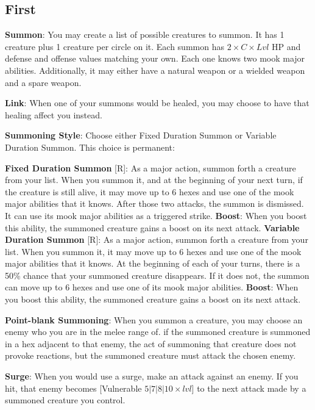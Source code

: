 \begin{multicols}{2}
\raggedcolumns
\subsection*{First \Facet}
\textbf{Summon}: You may create a list of possible creatures to summon. It has 1 creature plus 1 creature per circle on it. Each summon has $2 \times C \times Lvl$ HP and defense and offense values matching your own. Each one knows two mook major abilities. Additionally, it may either have a natural weapon or a wielded weapon and a spare weapon.

\textbf{Link}: When one of your summons would be healed, you may choose to have that healing affect you instead.

\textbf{Summoning Style}: Choose either Fixed Duration Summon or Variable Duration Summon. This choice is permanent:
\begin{itemize}
\thing \textbf{Fixed Duration Summon} [R]: As a major action, summon forth a creature from your list. When you summon it, and at the beginning of your next turn, if the creature is still alive, it may move up to 6 hexes and use one of the mook major abilities that it knows. After those two attacks, the summon is dismissed. It can use its mook major abilities as a triggered strike. \textbf{Boost}: When you boost this ability, the summoned creature gains a boost on its next attack.
\thing \textbf{Variable Duration Summon} [R]: As a major action, summon forth a creature from your list. When you summon it, it may move up to 6 hexes and use one of the mook major abilities that it knows. At the beginning of each of your turns, there is a 50\% chance that your summoned creature disappears. If it does not, the summon can move up to 6 hexes and use one of its mook major abilities. \textbf{Boost}: When you boost this ability, the summoned creature gains a boost on its next attack.
\end{itemize}
\textbf{Point-blank Summoning}: When you summon a creature, you may choose an enemy who you are in the melee range of. if the summoned creature is summoned in a hex adjacent to that enemy, the act of summoning that creature does not provoke reactions, but the summoned creature must attack the chosen enemy.

\textbf{Surge}: When you would use a surge, make an attack against an enemy. If you hit, that enemy becomes [Vulnerable $5|7|8|10\times lvl$] to the next attack made by a summoned creature you control.


\end{multicols}
